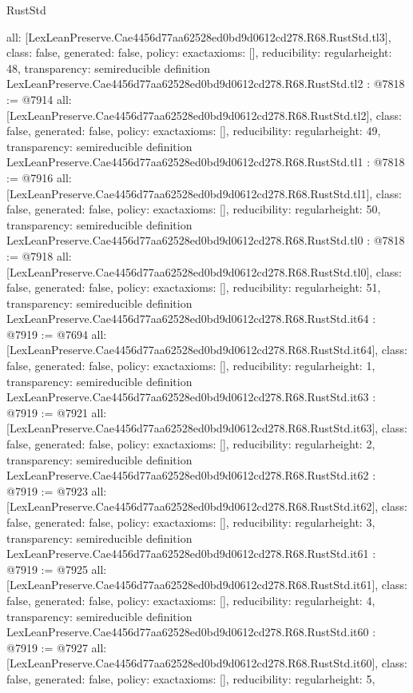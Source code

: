 \begin{lexlean}{RustStd}
\begin{coremodule}
{  all: [LexLeanPreserve.Cae4456d77aa62528ed0bd9d0612cd278.R68.RustStd.tl3],
  class: false,
  generated: false,
  policy: exact{axioms: []},
  reducibility: regular{height: 48},
  transparency: semireducible
}
definition LexLeanPreserve.Cae4456d77aa62528ed0bd9d0612cd278.R68.RustStd.tl2 : @7818 := @7914 {
  all: [LexLeanPreserve.Cae4456d77aa62528ed0bd9d0612cd278.R68.RustStd.tl2],
  class: false,
  generated: false,
  policy: exact{axioms: []},
  reducibility: regular{height: 49},
  transparency: semireducible
}
definition LexLeanPreserve.Cae4456d77aa62528ed0bd9d0612cd278.R68.RustStd.tl1 : @7818 := @7916 {
  all: [LexLeanPreserve.Cae4456d77aa62528ed0bd9d0612cd278.R68.RustStd.tl1],
  class: false,
  generated: false,
  policy: exact{axioms: []},
  reducibility: regular{height: 50},
  transparency: semireducible
}
definition LexLeanPreserve.Cae4456d77aa62528ed0bd9d0612cd278.R68.RustStd.tl0 : @7818 := @7918 {
  all: [LexLeanPreserve.Cae4456d77aa62528ed0bd9d0612cd278.R68.RustStd.tl0],
  class: false,
  generated: false,
  policy: exact{axioms: []},
  reducibility: regular{height: 51},
  transparency: semireducible
}
definition LexLeanPreserve.Cae4456d77aa62528ed0bd9d0612cd278.R68.RustStd.it64 : @7919 := @7694 {
  all: [LexLeanPreserve.Cae4456d77aa62528ed0bd9d0612cd278.R68.RustStd.it64],
  class: false,
  generated: false,
  policy: exact{axioms: []},
  reducibility: regular{height: 1},
  transparency: semireducible
}
definition LexLeanPreserve.Cae4456d77aa62528ed0bd9d0612cd278.R68.RustStd.it63 : @7919 := @7921 {
  all: [LexLeanPreserve.Cae4456d77aa62528ed0bd9d0612cd278.R68.RustStd.it63],
  class: false,
  generated: false,
  policy: exact{axioms: []},
  reducibility: regular{height: 2},
  transparency: semireducible
}
definition LexLeanPreserve.Cae4456d77aa62528ed0bd9d0612cd278.R68.RustStd.it62 : @7919 := @7923 {
  all: [LexLeanPreserve.Cae4456d77aa62528ed0bd9d0612cd278.R68.RustStd.it62],
  class: false,
  generated: false,
  policy: exact{axioms: []},
  reducibility: regular{height: 3},
  transparency: semireducible
}
definition LexLeanPreserve.Cae4456d77aa62528ed0bd9d0612cd278.R68.RustStd.it61 : @7919 := @7925 {
  all: [LexLeanPreserve.Cae4456d77aa62528ed0bd9d0612cd278.R68.RustStd.it61],
  class: false,
  generated: false,
  policy: exact{axioms: []},
  reducibility: regular{height: 4},
  transparency: semireducible
}
definition LexLeanPreserve.Cae4456d77aa62528ed0bd9d0612cd278.R68.RustStd.it60 : @7919 := @7927 {
  all: [LexLeanPreserve.Cae4456d77aa62528ed0bd9d0612cd278.R68.RustStd.it60],
  class: false,
  generated: false,
  policy: exact{axioms: []},
  reducibility: regular{height: 5},
}
\end{coremodule}
\end{lexlean}
